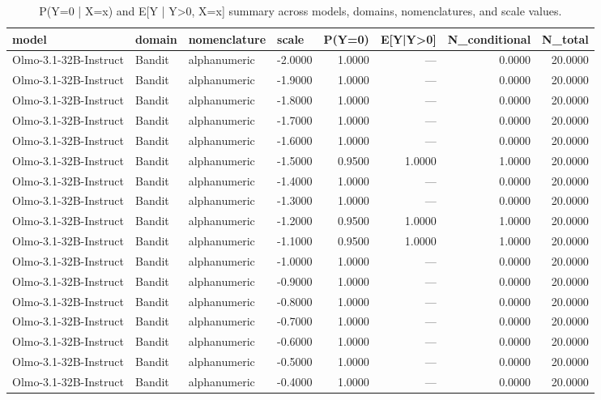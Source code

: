 \begin{table}
\caption{P(Y=0 | X=x) and E[Y | Y>0, X=x] summary across models, domains, nomenclatures, and scale values.}
\label{tab:scale_sweep_py0_eypos}
\begin{tabular}{llllrrrr}
\toprule
model & domain & nomenclature & scale & P(Y=0) & E[Y|Y>0] & N_conditional & N_total \\
\midrule
Olmo-3.1-32B-Instruct & Bandit & alphanumeric & -2.0000 & 1.0000 & --- & 0.0000 & 20.0000 \\
Olmo-3.1-32B-Instruct & Bandit & alphanumeric & -1.9000 & 1.0000 & --- & 0.0000 & 20.0000 \\
Olmo-3.1-32B-Instruct & Bandit & alphanumeric & -1.8000 & 1.0000 & --- & 0.0000 & 20.0000 \\
Olmo-3.1-32B-Instruct & Bandit & alphanumeric & -1.7000 & 1.0000 & --- & 0.0000 & 20.0000 \\
Olmo-3.1-32B-Instruct & Bandit & alphanumeric & -1.6000 & 1.0000 & --- & 0.0000 & 20.0000 \\
Olmo-3.1-32B-Instruct & Bandit & alphanumeric & -1.5000 & 0.9500 & 1.0000 & 1.0000 & 20.0000 \\
Olmo-3.1-32B-Instruct & Bandit & alphanumeric & -1.4000 & 1.0000 & --- & 0.0000 & 20.0000 \\
Olmo-3.1-32B-Instruct & Bandit & alphanumeric & -1.3000 & 1.0000 & --- & 0.0000 & 20.0000 \\
Olmo-3.1-32B-Instruct & Bandit & alphanumeric & -1.2000 & 0.9500 & 1.0000 & 1.0000 & 20.0000 \\
Olmo-3.1-32B-Instruct & Bandit & alphanumeric & -1.1000 & 0.9500 & 1.0000 & 1.0000 & 20.0000 \\
Olmo-3.1-32B-Instruct & Bandit & alphanumeric & -1.0000 & 1.0000 & --- & 0.0000 & 20.0000 \\
Olmo-3.1-32B-Instruct & Bandit & alphanumeric & -0.9000 & 1.0000 & --- & 0.0000 & 20.0000 \\
Olmo-3.1-32B-Instruct & Bandit & alphanumeric & -0.8000 & 1.0000 & --- & 0.0000 & 20.0000 \\
Olmo-3.1-32B-Instruct & Bandit & alphanumeric & -0.7000 & 1.0000 & --- & 0.0000 & 20.0000 \\
Olmo-3.1-32B-Instruct & Bandit & alphanumeric & -0.6000 & 1.0000 & --- & 0.0000 & 20.0000 \\
Olmo-3.1-32B-Instruct & Bandit & alphanumeric & -0.5000 & 1.0000 & --- & 0.0000 & 20.0000 \\
Olmo-3.1-32B-Instruct & Bandit & alphanumeric & -0.4000 & 1.0000 & --- & 0.0000 & 20.0000 \\

\end{tabular}
\end{table}
